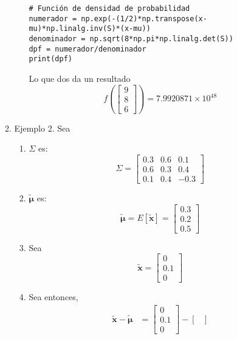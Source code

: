 \begin{problema}
\begin{enumerate}
\begin{sol}
\begin{enumerate}
\begin{enumerate}
\begin{verbatim}
# Función de densidad de probabilidad
numerador = np.exp(-(1/2)*np.transpose(x-mu)*np.linalg.inv(S)*(x-mu))
denominador = np.sqrt(8*np.pi*np.linalg.det(S))
dpf = numerador/denominador 
print(dpf)
                \end{verbatim}
                Lo que dos da un resultado 
                $$f\left(\begin{bmatrix}
                    9\\
                    8\\
                    6
                \end{bmatrix}\right)= 7.9920871\times 10^{48}$$
            \end{enumerate}
            \item Ejemplo 2. Sea \begin{enumerate}
                \item $\Sigma$ es: 
                $$\Sigma =
                \begin{bmatrix}
                    0.3 & 0.6 & 0.1\\
                    0.6 & 0.3 & 0.4\\
                    0.1 & 0.4 & -0.3
                \end{bmatrix}
                $$
                \item $\tilde{\boldsymbol{\mu}}$ es: 
                $$\tilde{\boldsymbol{\mu}}=E[\tilde{\boldsymbol{x}}]=\begin{bmatrix}
                    0.3\\
                    0.2\\
                    0.5
                \end{bmatrix}$$
                \item Sea $$\tilde{\boldsymbol{x}}= \begin{bmatrix}
                    0\\
                    0.1\\
                    0
                \end{bmatrix}$$
                \item Sea entonces, 
                \begin{align*}
                    \tilde{\boldsymbol{x}}-\tilde{\boldsymbol{\mu}} &= \begin{bmatrix}
                        0\\
                    0.1\\
                    0
                    \end{bmatrix}- \begin{bmatrix}

\end{bmatrix}
\end{align*}
\end{enumerate}
\end{enumerate}
\end{sol}
\end{enumerate}
\end{problema}

